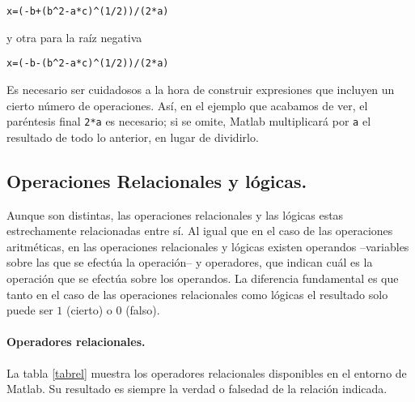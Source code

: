 \begin{verbatim}
x=(-b+(b^2-a*c)^(1/2))/(2*a)
\end{verbatim}
y otra para la raíz negativa

\begin{verbatim}
x=(-b-(b^2-a*c)^(1/2))/(2*a)
\end{verbatim}

Es necesario ser cuidadosos a la hora de construir expresiones que incluyen un cierto número de operaciones. Así, en el ejemplo que acabamos de ver, el paréntesis final \texttt{2*a} es necesario; si se omite, Matlab multiplicará por \texttt{a} el resultado de todo lo anterior, en lugar de dividirlo.

\subsection{Operaciones Relacionales y lógicas.}
Aunque son distintas, las operaciones relacionales y las lógicas estas estrechamente relacionadas entre sí. Al igual que en el caso de las operaciones aritméticas, en las operaciones relacionales y lógicas existen operandos --variables sobre las que se efectúa la operación-- y operadores, que indican cuál es la operación que se efectúa sobre los operandos. La diferencia fundamental es que tanto en el caso de las operaciones relacionales como lógicas el resultado solo puede ser $1$ (cierto) o $0$ (falso). 

\paragraph{Operadores relacionales.}La tabla \ref{tabrel} muestra los operadores relacionales disponibles en el entorno de Matlab. Su resultado es siempre la verdad o falsedad de la relación indicada. 

